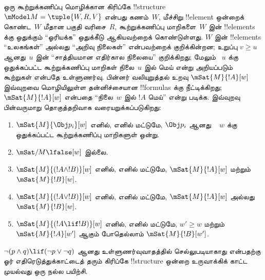 \documentclass[../../../include/open-logic-section]{subfiles}
\begin{document}
ஒரு கூற்றுக்கணிப்பு மொழிக்கான கிரிப்கே !!{structure}
~$\mModel M = \tuple{W, R, V}$ என்பது கணம்~$W$, மீச்சிறு
!!{element} ஒன்றைக் கொண்ட~$W$ மீதான பகுதி வரிசை~$R$, கூற்றுக்கணிப்பு
மாறிகளை~$W$ இன் !!{element}s க்கு ஒதுக்கும் ``ஓரியக்க'' ஒதுக்கீடு
ஆகியவற்றைக் கொண்டுள்ளது. $W$ இன் !!{element}s ``உலகங்கள்'' அல்லது
``அறிவு நிலைகள்'' என்பவற்றைக் குறிக்கின்றன; உறுப்பு $v \geq
u$ ஆனது~$u$ இன் ``சாத்தியமான எதிர்கால நிலையை'' குறிக்கிறது; மேலும்
~$u$ க்கு ஒதுக்கப்பட்ட கூற்றுக்கணிப்பு மாறிகள் நிலை~$u$ இல் மெய் என்று
அறியப்படும் கூற்றுகள் என்பதே உள்ளுணர்வு. பின்னர் வலியுறுத்தல் உறவு
$\mSat{M}{!A}[w]$ இவ்வுறவை மொழியிலுள்ள தன்னிச்சையான !!{formula}s க்கு
நீட்டிக்கிறது; $\mSat{M}{!A}[w]$ என்பதை ``நிலை~$w$ இல் $!A$ மெய்''
என்று படிக்க. இவ்வுறவு பின்வருமாறு தொகுத்தறிவாக வரையறுக்கப்படுகிறது:
\begin{enumerate}
\item $\mSat{M}{\Obj p_i}[w]$ எனில், எனில் மட்டுமே, $\Obj p_i$ ஆனது
  ~ $w$ க்கு ஒதுக்கப்பட்ட கூற்றுக்கணிப்பு மாறிகளுள் ஒன்று.
\item $\mSat/{M}{\lfalse}[w]$ இல்லை.
\item $\mSat{M}{(!A \land !B)}[w]$ எனில், எனில் மட்டுமே,
  $\mSat{M}{!A}[w]$ மற்றும் $\mSat{M}{!B}[w]$.
\item $\mSat{M}{(!A \lor !B)}[w]$ எனில், எனில் மட்டுமே,
  $\mSat{M}{!A}[w]$ அல்லது $\mSat{M}{!B}[w]$.
\item $\mSat{M}{(!A \lif !B)}[w]$ எனில், எனில் மட்டுமே,
  $w' \geq w$ மற்றும் $\mSat{M}{!A}[w']$ ஆகும் போதெல்லாம்
  $\mSat{M}{!B}[w']$.
\end{enumerate}
$\lnot (p \land q) \lif
(\lnot p \lor \lnot q)$ ஆனது உள்ளுணர்வுவாதத்தில் செல்லுபடியாகாது
என்பதற்கு ஓர் எதிரெடுத்துக்காட்டைத் தரும் கிரிப்கே !!{structure}
ஒன்றை உருவாக்கிக் காட்ட முயல்வது ஒரு நல்ல பயிற்சி.
\end{document}
